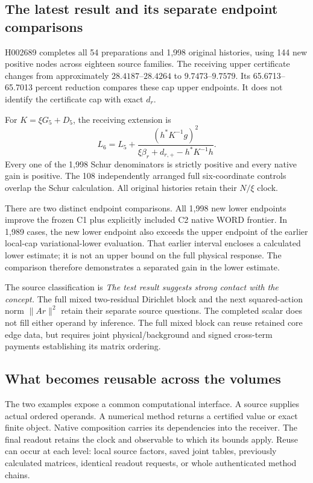 \subsection{The latest result and its separate endpoint comparisons}

H002689 completes all 54 preparations and 1,998 original histories, using 144 new positive nodes across eighteen source families. The receiving upper certificate changes from approximately $28.4187$--$28.4264$ to $9.7473$--$9.7579$. Its 65.6713--65.7013 percent reduction compares these cap upper endpoints. It does not identify the certificate cap with exact $d_r$.

For $K=\xi G_5+D_5$, the receiving extension is
\begin{equation}
 L_6=L_5+\frac{(h^*K^{-1}g)^2}
 {\xi\beta_r+d_{r,+}-h^*K^{-1}h}.
\end{equation}
Every one of the 1,998 Schur denominators is strictly positive and every native gain is positive. The 108 independently arranged full six-coordinate controls overlap the Schur calculation. All original histories retain their $N/\xi$ clock.

There are two distinct endpoint comparisons. All 1,998 new lower endpoints improve the frozen C1 plus explicitly included C2 native WORD frontier. In 1,989 cases, the new lower endpoint also exceeds the upper endpoint of the earlier local-cap variational-lower evaluation. That earlier interval encloses a calculated lower estimate; it is not an upper bound on the full physical response. The comparison therefore demonstrates a separated gain in the lower estimate.

The source classification is \emph{The test result suggests strong contact with the concept.} The full mixed two-residual Dirichlet block and the next squared-action norm $\|Ar\|^2$ retain their separate source questions. The completed scalar does not fill either operand by inference. The full mixed block can reuse retained core edge data, but requires joint physical/background and signed cross-term payments establishing its matrix ordering.

\subsection{What becomes reusable across the volumes}

The two examples expose a common computational interface. A source supplies actual ordered operands. A numerical method returns a certified value or exact finite object. Native composition carries its dependencies into the receiver. The final readout retains the clock and observable to which its bounds apply. Reuse can occur at each level: local source factors, saved joint tables, previously calculated matrices, identical readout requests, or whole authenticated method chains.

